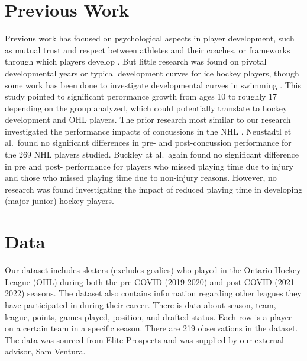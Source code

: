 \documentclass[12pt]{article}
\begin{document}
\hypertarget{previous-work}{%
\section{Previous Work}\label{previous-work}}

Previous work has focused on psychological aspects in player
development, such as mutual trust and respect between athletes and their
coaches, or frameworks through which players develop
\cite{lefebvre, soberlak}. But little research was found on pivotal
developmental years or typical development curves for ice hockey
players, though some work has been done to investigate developmental
curves in swimming \citet{born}. This study pointed to significant
perormance growth from ages 10 to roughly 17 depending on the group
analyzed, which could potentially translate to hockey development and
OHL players. The prior research most similar to our research
investigated the performance impacts of concussions in the NHL
\cite{buckley, neustadtl}. Neustadtl et al.~found no significant
differences in pre- and post-concussion performance for the 269 NHL
players studied. Buckley at al.~again found no significant difference in
pre and post- performance for players who missed playing time due to
injury and those who missed playing time due to non-injury reasons.
However, no research was found investigating the impact of reduced
playing time in developing (major junior) hockey players.

\hypertarget{data}{%
\section{Data}\label{data}}

Our dataset includes skaters (excludes goalies) who played in the
Ontario Hockey League (OHL) during both the pre-COVID (2019-2020) and
post-COVID (2021-2022) seasons. The dataset also contains information
regarding other leagues they have participated in during their career.
There is data about season, team, league, points, games played,
position, and drafted status. Each row is a player on a certain team in
a specific season. There are 219 observations in the dataset. The data
was sourced from Elite Prospects and was supplied by our external
advisor, Sam Ventura.
\end{document}
